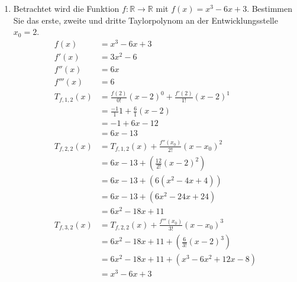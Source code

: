 \documentclass[12pt]{article}
\begin{document}

\noindent
\begin{enumerate}[start=1,label={\bfseries Frage \arabic*:},leftmargin=1in]

    \item Betrachtet wird die Funktion $f:\mathbb{R} \to \mathbb{R}$ mit $f(x)=x^{3}-6x+3$. Bestimmen Sie das erste, zweite und dritte Taylorpolynom an der Entwicklungsstelle $x_0=2$.
    \begin{align*}
        f(x)&=x^{3}-6x+3 \\
        f'(x)&=3x^{2}-6 \\
        f''(x)&=6x \\
        f'''(x)&=6 \\
        T_{f,1,2}(x)&=\frac{f(2)}{0!}(x-2)^{0} + \frac{f'(2)}{1!}(x-2)^{1} \\
        &=\frac{-1}{1}1 + \frac{6}{1}(x-2) \\
        &=-1 + 6x - 12 \\
        &=6x - 13 \\
        T_{f,2,2}(x)&=T_{f,1,2}(x) + \frac{f''(x_0)}{2!}(x-x_0)^{2} \\
        &=6x - 13 + (\frac{12}{2!}(x-2)^2) \\
        &=6x - 13 + (6 (x^{2} - 4x + 4)) \\
        &=6x - 13 + (6x^{2} - 24x + 24) \\
        &=6x^{2} - 18x + 11 \\
        T_{f,3,2}(x)&=T_{f,2,2}(x) + \frac{f'''(x_0)}{3!}(x-x_0)^{3} \\
        &=6x^{2} - 18x + 11 + (\frac{6}{3!}(x-2)^{3}) \\
        &=6x^{2} - 18x + 11 + (x^3 - 6x^{2} + 12x - 8) \\
        &=x^3 - 6x + 3
    \end{align*}

    \enlargethispage{-\baselineskip}
    \enlargethispage{-\baselineskip}
    \enlargethispage{-\baselineskip}
    \enlargethispage{-\baselineskip}
    \enlargethispage{-\baselineskip}
    \enlargethispage{-\baselineskip}
    \enlargethispage{-\baselineskip}
    \enlargethispage{-\baselineskip}
    \enlargethispage{-\baselineskip}
    \enlargethispage{-\baselineskip}
    \enlargethispage{-\baselineskip}
    \enlargethispage{-\baselineskip}
    \enlargethispage{-\baselineskip}
    \enlargethispage{-\baselineskip}
    \enlargethispage{-\baselineskip}
    \enlargethispage{-\baselineskip}


\end{enumerate}
\end{document}
